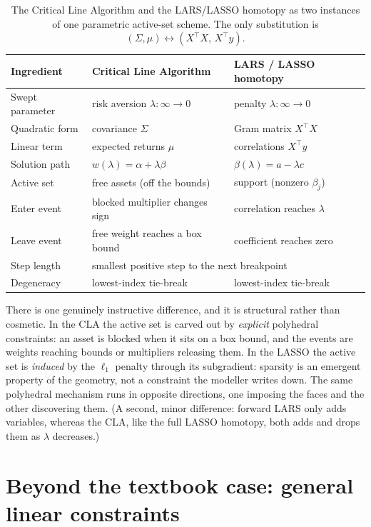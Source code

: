 \documentclass[11pt]{article}
\newcommand{\Sig}{\Sigma}
\newcommand{\trans}{^{\top}}
\begin{document}
\begin{table}[t]
\centering
\begin{tabular}{lll}
\toprule
Ingredient & Critical Line Algorithm & LARS / LASSO homotopy \\
\midrule
Swept parameter & risk aversion $\lambda:\infty\!\to\!0$ & penalty $\lambda:\infty\!\to\!0$ \\
Quadratic form  & covariance $\Sig$ & Gram matrix $X\trans X$ \\
Linear term     & expected returns $\mu$ & correlations $X\trans y$ \\
Solution path   & $w(\lambda)=\alpha+\lambda\beta$ & $\beta(\lambda)=a-\lambda c$ \\
Active set      & free assets (off the bounds) & support (nonzero $\beta_j$) \\
Enter event     & blocked multiplier changes sign & correlation reaches $\lambda$ \\
Leave event     & free weight reaches a box bound & coefficient reaches zero \\
Step length     & \multicolumn{2}{l}{smallest positive step to the next breakpoint} \\
Degeneracy      & lowest-index tie-break & lowest-index tie-break \\
\bottomrule
\end{tabular}
\caption{The Critical Line Algorithm and the LARS/LASSO homotopy as two instances of
one parametric active-set scheme. The only substitution is
$(\Sig,\mu)\leftrightarrow(X\trans X,\,X\trans y)$.}
\label{tab:dict}
\end{table}

There is one genuinely instructive difference, and it is structural rather than
cosmetic. In the CLA the active set is carved out by \emph{explicit} polyhedral
constraints: an asset is blocked when it sits on a box bound, and the events are
weights reaching bounds or multipliers releasing them. In the LASSO the active set
is \emph{induced} by the $\ell_1$ penalty through its subgradient: sparsity is an
emergent property of the geometry, not a constraint the modeller writes down. The
same polyhedral mechanism runs in opposite directions, one imposing the faces and
the other discovering them. (A second, minor difference: forward LARS only adds
variables, whereas the CLA, like the full LASSO homotopy, both adds and drops them
as $\lambda$ decreases.)

\section{Beyond the textbook case: general linear constraints}
\end{document}
